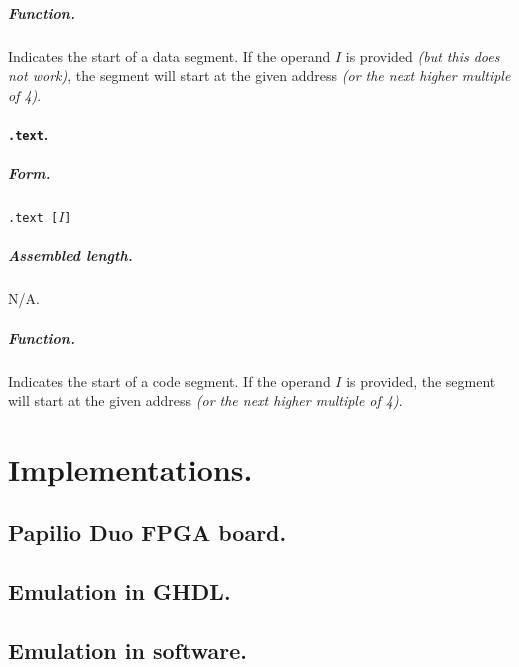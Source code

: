 \documentclass[12pt,english,twoside]{report}
\def\code{\texttt}
\newcommand\incomplete[1]{{\color{red}\it #1}}
\begin{document}
\paragraph{Function.}
Indicates the start of a data segment. If the operand $I$ is
provided\incomplete{ (but this does not work)}, the segment will start
  at the given address\incomplete{ (or the next higher multiple
    of 4)}.

\subsubsection*{\label{Asm_text}\code{.text}.}
\paragraph{Form.}
\code{.text [$I$]}

\paragraph{Assembled length.} N/A.

\paragraph{Function.}
Indicates the start of a code segment. If the operand $I$ is provided,
the segment will start at the given address\incomplete{ (or the next
  higher multiple of 4)}.

\chapter{\label{sec:Implementations} Implementations.}

\section{Papilio Duo FPGA board.}


\section{Emulation in GHDL.}

\section{Emulation in software.}

\end{document}
